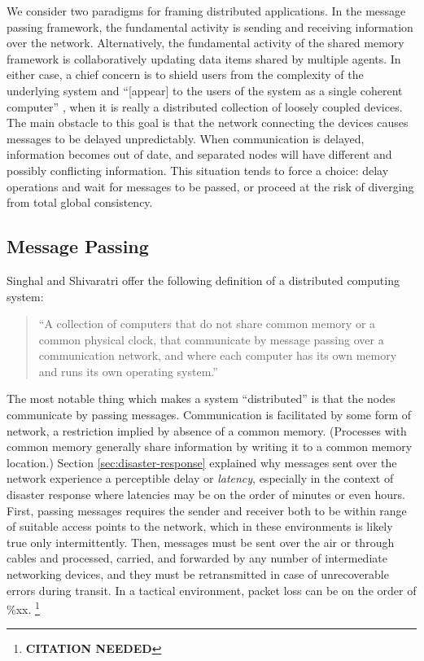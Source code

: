 \documentclass[]             %
{NASA}                       %
\theoremstyle{definition}
\newcommand{\citationneeded}{\footnote{\textbf{CITATION NEEDED}}}
\begin{document}
We consider two paradigms for framing distributed applications. In the
message passing framework, the fundamental activity is sending and
receiving information over the network. Alternatively, the fundamental
activity of the shared memory framework is collaboratively updating
data items shared by multiple agents. In either case, a chief concern
is to shield users from the complexity of the underlying system and
``{[}appear{]} to the users of the system as a single coherent
computer'' \cite{TanenbaumSteen07}, when it is really a distributed
collection of loosely coupled devices. The main obstacle to this goal
is that the network connecting the devices causes messages to be
delayed unpredictably. When communication is delayed, information
becomes out of date, and separated nodes will have different and
possibly conflicting information. This situation tends to force a
choice: delay operations and wait for messages to be passed, or
proceed at the risk of diverging from total global consistency.

\subsection{Message Passing}
\label{ssec:message-passing}

Singhal and Shivaratri \cite{10.5555/562065} offer the following
definition of a distributed computing system:

\begin{quote}
  ``A collection of computers that do not share common memory or a common
  physical clock, that communicate by message passing over a communication
  network, and where each computer has its own memory and runs its own
  operating system.''
\end{quote}
The most notable thing which makes a system ``distributed'' is that
the nodes communicate by passing messages. Communication is
facilitated by some form of network, a restriction implied by absence
of a common memory. (Processes with common memory generally share
information by writing it to a common memory location.) Section
\ref{sec:disaster-response} explained why messages sent over the
network experience a perceptible delay or \emph{latency}, especially
in the context of disaster response where latencies may be on the
order of minutes or even hours. First, passing messages requires the
sender and receiver both to be within range of suitable access points
to the network, which in these environments is likely true only
intermittently. Then, messages must be sent over the air or through
cables and processed, carried, and forwarded by any number of
intermediate networking devices, and they must be retransmitted in
case of unrecoverable errors during transit. In a tactical
environment, packet loss can be on the order of \%xx. \citationneeded
\end{document}
